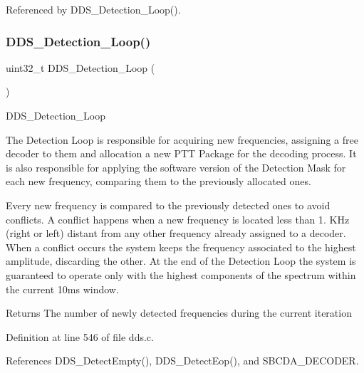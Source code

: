 Referenced by D\+D\+S\+\_\+\+Detection\+\_\+\+Loop().

\mbox{\label{group___d_d_s___a_p_i_ga1f53b4fdeb56f560600428473023f819}} 
\subsubsection{\texorpdfstring{D\+D\+S\+\_\+\+Detection\+\_\+\+Loop()}{DDS\_Detection\_Loop()}}
{\footnotesize\ttfamily uint32\+\_\+t D\+D\+S\+\_\+\+Detection\+\_\+\+Loop (\begin{DoxyParamCaption}{ }\end{DoxyParamCaption})}

D\+D\+S\+\_\+\+Detection\+\_\+\+Loop

The Detection Loop is responsible for acquiring new frequencies, assigning a free decoder to them and allocation a new P\+TT Package for the decoding process. It is also responsible for applying the software version of the Detection Mask for each new frequency, comparing them to the previously allocated ones.

Every new frequency is compared to the previously detected ones to avoid conflicts. A conflict happens when a new frequency is located less than 1. K\+Hz (right or left) distant from any other frequency already assigned to a decoder. When a conflict occurs the system keeps the frequency associated to the highest amplitude, discarding the other. At the end of the Detection Loop the system is guaranteed to operate only with the highest components of the spectrum within the current 10ms window.

\begin{DoxyReturn}{Returns}
The number of newly detected frequencies during the current iteration 
\end{DoxyReturn}


Definition at line 546 of file dds.\+c.



References D\+D\+S\+\_\+\+Detect\+Empty(), D\+D\+S\+\_\+\+Detect\+Eop(), and S\+B\+C\+D\+A\+\_\+\+D\+E\+C\+O\+D\+ER.

\mbox{\label{group___d_d_s___a_p_i_ga17065a48b0ce7ad24740a144bb24fb55}} 
